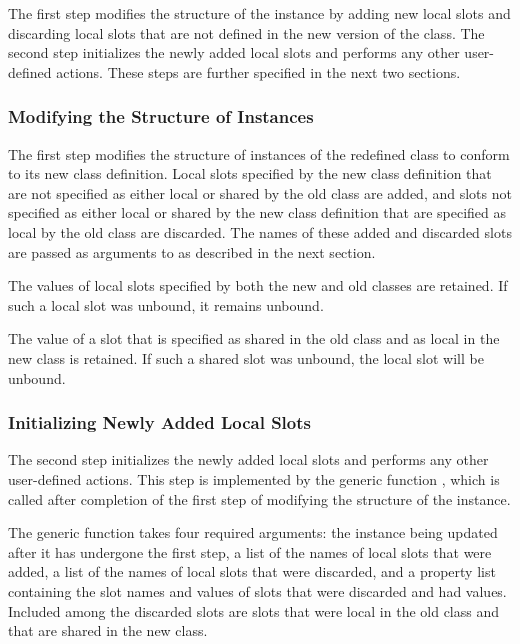 The first step modifies the structure of the instance by adding new
local slots and discarding local slots that are not defined in the new
version of the class.
The second step initializes the newly added local slots and performs
any other user-defined actions. These steps are further specified
in the next two sections.

\subsubsection{Modifying the Structure of Instances}

The first step modifies the structure of instances of the redefined
class to conform to its new class definition.  Local slots specified
by the new class definition that are not specified as either local or
shared by the old class are added, and slots not specified as either
local or shared by the new class definition that are specified as
local by the old class are discarded. The names of these added and discarded
slots are passed as arguments to 
as described in the next section.

The values of local slots specified by both the new and old classes
are retained. If such a local slot was unbound, it remains unbound.

The value of a slot that is specified as shared in the old class and
as local in the new class is retained.  If such a shared slot was
unbound, the local slot will be unbound.

\subsubsection{Initializing Newly Added Local Slots}

The second step initializes the newly added local slots and performs
any other user-defined actions.  This step is implemented by the generic
function , which is called after
completion of the first step of modifying the structure of the
instance.

The generic function  takes
four required arguments: the instance being updated after it has
undergone the first step, a list of the names of local slots that were
added, a list of the names of local slots that were discarded, and a
property list containing the slot names and values of slots that were
discarded and had values.  Included among the discarded slots are
slots that were local in the old class and that are shared in the new
class.

